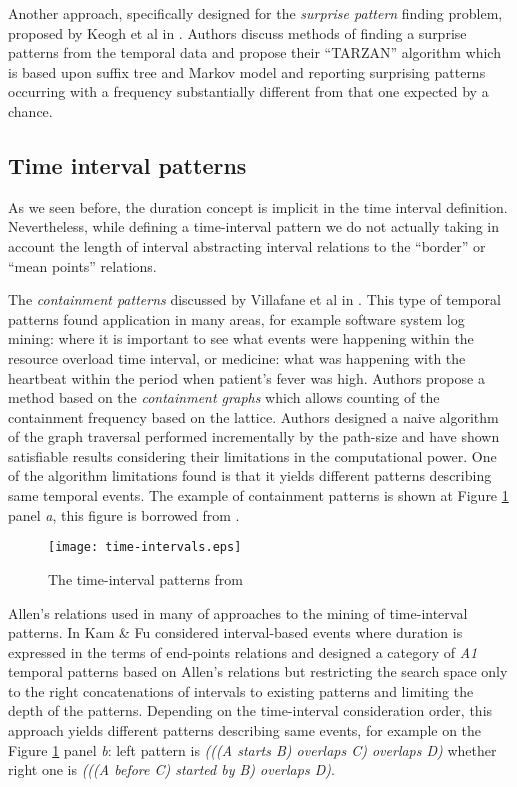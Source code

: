 Another approach, specifically designed for the \textit{surprise pattern} finding problem, proposed by Keogh et al in \cite{citeulike:3025877}. Authors discuss methods of finding a surprise patterns from the temporal data and propose their ``TARZAN'' algorithm which is based upon suffix tree and Markov model and reporting surprising patterns occurring with a frequency substantially different from that one expected by a chance.

\subsection{Time interval patterns}
As we seen before, the duration concept is implicit in the time interval definition. Nevertheless, while defining a time-interval pattern we do not actually taking in account the length of interval abstracting interval relations to the ``border'' or ``mean points'' relations.

The \textit{containment patterns} discussed by Villafane et al in \cite{citeulike:2804633}. This type of temporal patterns found application in many areas, for example software system log mining: where it is important to see what events were happening within the resource overload time interval, or medicine: what was happening with the heartbeat within the period when patient's fever was high. Authors propose a method based on the \textit{containment graphs} which allows counting of the containment frequency based on the lattice. Authors designed a naive algorithm of the graph traversal performed incrementally by the path-size and have shown satisfiable results considering their limitations in the computational power. One of the algorithm limitations found is that it yields different patterns describing same temporal events. The example of containment patterns is shown at Figure \ref{fig:timeintervals} panel \textit{a}, this figure is borrowed from \cite{citeulike:1748833}.

\begin{figure}[tbp]
   \centering
   \texttt{[image: time-intervals.eps]}
   \caption{The time-interval patterns from \cite{citeulike:1748833}}
   \label{fig:timeintervals}
\end{figure}

Allen's relations used in many of approaches to the mining of time-interval patterns. In \cite{citeulike:5159362} Kam \& Fu considered interval-based events where duration is expressed in the terms of end-points relations and designed a category of \textit{A1} temporal patterns based on Allen's relations but restricting the search space only to the right concatenations of intervals to existing patterns and limiting the depth of the patterns. Depending on the time-interval consideration order, this approach yields different patterns describing same events, for example on the Figure \ref{fig:timeintervals} panel \textit{b}: left pattern is \textit{(((A starts B) overlaps C) overlaps D)} whether right one is \textit{(((A before C) started by B) overlaps D)}.

